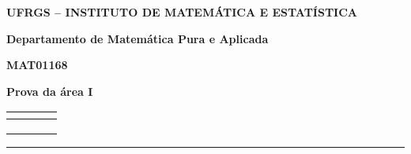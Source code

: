 \documentclass[10pt,a4paper]{article}%
\begin{document}
\noindent
\begin{minipage}[l]{11.4cm}

     {\bf UFRGS -- INSTITUTO DE MATEMÁTICA E ESTATÍSTICA}

    {\bf Departamento de Matemática Pura e Aplicada}
  
   {\bf MAT01168}

    {\bf Prova da área I}
\end{minipage}\hfill\begin{minipage}{5.85cm}
    \begin{tabular}{|c|c|c|c|}  \hline
        {\bf } & {\bf }& {\bf }&   {\bf }\!\! \\
        \hline
         \hline \hspace{1cm} & \hspace{1cm}   & \hspace{1cm}  & \hspace{1cm} \\
        &&& \\

        &&& \\
        \hline
    \end{tabular}
\end{minipage}

\vspace{0.2cm} \noindent \rule {17.9cm}{0.05cm}

\linespread{1.0}
\end{document}
